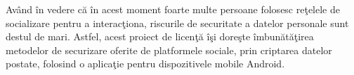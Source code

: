 Av\^{a}nd \^{i}n vedere c\u{a} \^{i}n acest moment foarte multe persoane folosesc re\c{t}elele de socializare pentru a interac\c{t}iona, riscurile de securitate a datelor personale sunt destul de mari. Astfel, acest proiect de licen\c{t}\u{a} \^{i}\c{s}i dore\c{s}te \^{i}mbun\u{a}t\u{a}\c{t}irea metodelor de securizare oferite de platformele sociale, prin criptarea datelor postate, folosind o aplica\c{t}ie pentru dispozitivele mobile Android.

